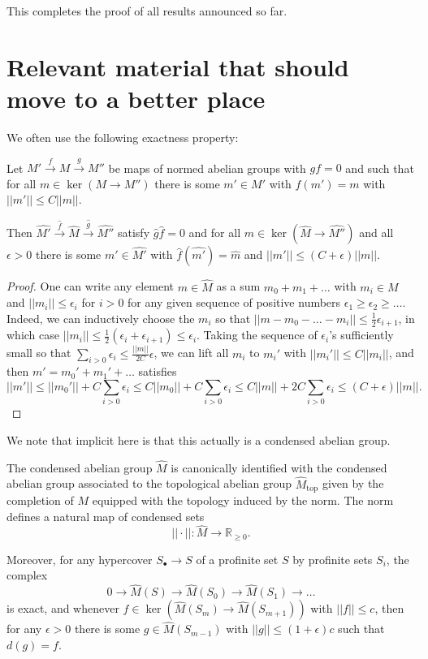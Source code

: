 This completes the proof of all results announced so far.



\section{Relevant material that should move to a better place}

We often use the following exactness property:

\begin{proposition}
  \label{prop:completeexact}
Let $M'\xrightarrow{f} M\xrightarrow{g} M''$ be maps of normed abelian groups with $gf=0$ and such that for all $m\in \ker(M\to M'')$ there is some $m'\in M'$ with $f(m')=m$ with $||m'||\leq C||m||$.

Then $\widehat{M'}\xrightarrow{\widehat{f}} \widehat{M}\xrightarrow{\widehat{g}} \widehat{M''}$ satisfy $\widehat{g}\widehat{f}=0$ and for all $m\in \ker(\widehat{M}\to \widehat{M''})$ and all $\epsilon>0$ there is some $m'\in \widehat{M'}$ with $\widehat{f}(\widehat{m'})=\widehat{m}$ and $||m'||\leq (C+\epsilon)||m||$.
\end{proposition}

\begin{proof} One can write any element $m\in \widehat{M}$ as a sum $m_0+m_1+\ldots$ with $m_i\in M$ and $||m_i||\leq \epsilon_i$ for $i>0$ for any given sequence of positive numbers $\epsilon_1\geq \epsilon_2\geq \ldots$. Indeed, we can inductively choose the $m_i$ so that $||m-m_0-\ldots-m_i||\leq \tfrac 12 \epsilon_{i+1}$, in which case $||m_i||\leq \tfrac 12(\epsilon_i+\epsilon_{i+1})\leq \epsilon_i$. Taking the sequence of $\epsilon_i$'s sufficiently small so that $\sum_{i>0} \epsilon_i\leq \tfrac {||m||}{2C} \epsilon$, we can lift all $m_i$ to $m_i'$ with $||m_i'||\leq C||m_i||$, and then $m'=m_0'+m_1'+\ldots$ satisfies
\[
||m'||\leq ||m_0'||+C\sum_{i>0} \epsilon_i\leq C||m_0||+C\sum_{i>0} \epsilon_i\leq C||m||+2C\sum_{i>0} \epsilon_i\leq (C+\epsilon)||m||.
\]
\end{proof}

We note that implicit here is that this actually is a condensed abelian group.

\begin{proposition}
  \label{prop:normedcompletion}
The condensed abelian group $\widehat{M}$ is canonically identified with the condensed abelian group associated to the topological abelian group $\widehat{M}_{\mathrm{top}}$ given by the completion of $M$ equipped with the topology induced by the norm. The norm defines a natural map of condensed sets
\[
||\cdot||: \widehat{M}\to \mathbb R_{\geq 0}.
\]

Moreover, for any hypercover $S_\bullet\to S$ of a profinite set $S$ by profinite sets $S_i$, the complex
\[
0\to \widehat{M}(S)\to \widehat{M}(S_0)\to \widehat{M}(S_1)\to \ldots
\]
is exact, and whenever $f\in \ker(\widehat{M}(S_m)\to \widehat{M}(S_{m+1}))$ with $||f||\leq c$, then for any $\epsilon>0$ there is some $g\in \widehat{M}(S_{m-1})$ with $||g||\leq (1+\epsilon)c$ such that $d(g)=f$.
\end{proposition}

